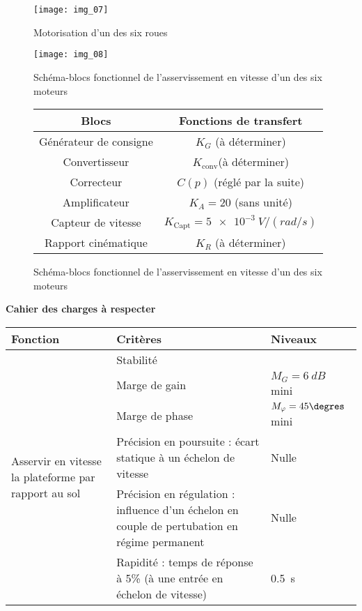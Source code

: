 \begin{figure}[H]
\centering
\texttt{[image: img\_07]}
\caption{Motorisation d'un des six roues\label{img:07}}
\end{figure}

\begin{figure}[H]
\centering
\texttt{[image: img\_08]}
\caption{Schéma-blocs fonctionnel de l’asservissement en vitesse d’un des six moteurs\label{img:08}}
\end{figure}


\begin{figure}[H]
\centering
\begin{tabular}{cc}
\hline
\textbf{Blocs} & \textbf{Fonctions de transfert} 	\\ \hline\hline
Générateur de consigne 	& $K_G$ (à déterminer) 		\\ \hline
Convertisseur 		& $K_{\text{conv}}$(à déterminer)	\\ \hline
Correcteur 		& $C(p)$ (réglé par la suite)	\\ \hline
Amplificateur 		& $K_A = 20 $ (sans unité)	\\ \hline
Capteur de vitesse 	& $K_{\text{Capt}}= \SI{5e-3}{V/(rad/s)}$ 	\\ \hline
Rapport cinématique 	& $K_R$ (à déterminer) 	\\ \hline
\end{tabular}

\caption{Schéma-blocs fonctionnel de l’asservissement en vitesse d’un des six moteurs\label{img:09}}
\end{figure}

\textbf{Cahier des charges à respecter}

\begin{center}
\begin{tabular}{lp{9cm}l}
\hline
\textbf{Fonction} & \textbf{Critères} & \textbf{Niveaux} \\ \hline\hline
\multirow{7}{3cm}{Asservir en vitesse la plateforme par rapport au sol} & 
Stabilité & \\ %
& Marge de gain		& $M_G=\SI{6}{dB}$ mini \\ %
& Marge de phase	& $M_{\varphi} =45\degres$ mini \\ \cline{2-3}
& Précision en poursuite : écart statique à un échelon de vitesse & Nulle \\ %
& Précision en régulation : influence d'un échelon en couple de pertubation en régime permanent  & Nulle \\ \cline{2-3}%
& Rapidité : temps de réponse à 5\% (à une entrée en échelon de vitesse) & \SI{0,5}{s} \\ \hline
\end{tabular}
\end{center}


